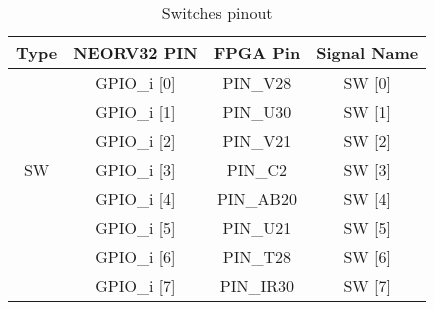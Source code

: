 \begin{table}[!htb]\scriptsize
    \centering
    \begin{tabular}{c c c c}
        \toprule[1.5pt]
        \textbf{Type} & \quad \quad \textbf{NEORV32 PIN} & \quad \quad \textbf{FPGA Pin} & \quad \quad \textbf{Signal Name}  \\
          
        \midrule
               & \quad \quad GPIO\_i [0] & \quad \quad PIN\_V28  & \quad \quad SW [0]\\
               & \quad \quad GPIO\_i [1] & \quad \quad PIN\_U30  & \quad \quad SW [1]\\
               & \quad \quad GPIO\_i [2] & \quad \quad PIN\_V21  & \quad \quad SW [2]\\
        SW     & \quad \quad GPIO\_i [3] & \quad \quad PIN\_C2   & \quad \quad SW [3]\\        
               & \quad \quad GPIO\_i [4] & \quad \quad PIN\_AB20 & \quad \quad SW [4]\\
               & \quad \quad GPIO\_i [5] & \quad \quad PIN\_U21  & \quad \quad SW [5]\\
               & \quad \quad GPIO\_i [6] & \quad \quad PIN\_T28  & \quad \quad SW [6]\\
               & \quad \quad GPIO\_i [7] & \quad \quad PIN\_IR30 & \quad \quad SW [7]\\
            \bottomrule[1.5pt]
         
    \end{tabular}
    \caption{\label{tab:sw_i}Switches pinout}
\end{table}

